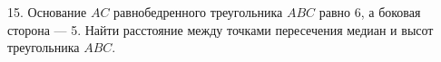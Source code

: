 15. Основание $AC$ равнобедренного треугольника $ABC$ равно 6, а боковая сторона --- 5. Найти расстояние между точками пересечения медиан и высот треугольника $ABC.$\\
